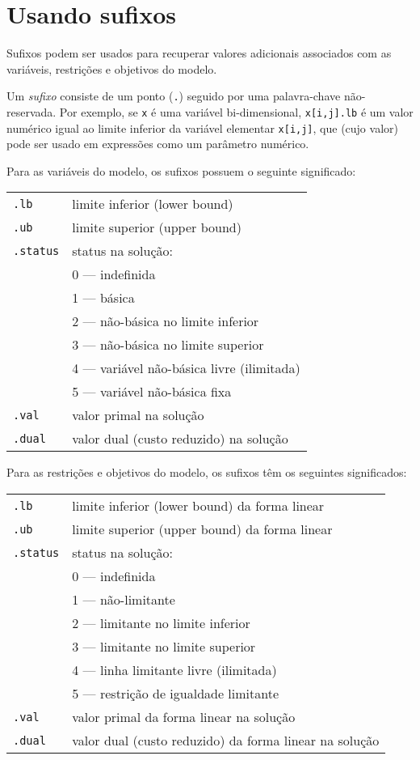 \documentclass[11pt, brazil]{report}
\begin{document}

\appendix

\chapter{Usando sufixos}

\vspace*{-12pt}

Sufixos podem ser usados para recuperar valores adicionais
associados com as variáveis, restrições e objetivos do modelo.

Um {\it sufixo} consiste de um ponto ({\tt.}) seguido por uma palavra-chave
não-reservada. Por exemplo, se {\tt x} é uma variável bi-dimensional,
{\tt x[i,j].lb} é um valor numérico igual ao limite inferior da variável
elementar {\tt x[i,j]}, que (cujo valor) pode ser usado em expressões
como um parâmetro numérico.

Para as variáveis do modelo, os sufixos possuem o seguinte significado:

\begin{tabular}{@{}ll@{}}
{\tt.lb}&limite inferior (lower bound)\\
{\tt.ub}&limite superior (upper bound)\\
{\tt.status}&status na solução:\\
&0 --- indefinida\\
&1 --- básica\\
&2 --- não-básica no limite inferior\\
&3 --- não-básica no limite superior\\
&4 --- variável não-básica livre (ilimitada)\\
&5 --- variável não-básica fixa\\
{\tt.val}&valor primal na solução\\
{\tt.dual}&valor dual (custo reduzido) na solução\\
\end{tabular}

Para as restrições e objetivos do modelo, os sufixos têm os seguintes significados:

\begin{tabular}{@{}ll@{}}
{\tt.lb}&limite inferior (lower bound) da forma linear\\
{\tt.ub}&limite superior (upper bound) da forma linear\\
{\tt.status}&status na solução:\\
&0 --- indefinida\\
&1 --- não-limitante\\
&2 --- limitante no limite inferior\\
&3 --- limitante no limite superior\\
&4 --- linha limitante livre (ilimitada)\\
&5 --- restrição de igualdade limitante\\
{\tt.val}&valor primal da forma linear na solução\\
{\tt.dual}&valor dual (custo reduzido) da forma linear na solução\\
\end{tabular}
\end{document}
